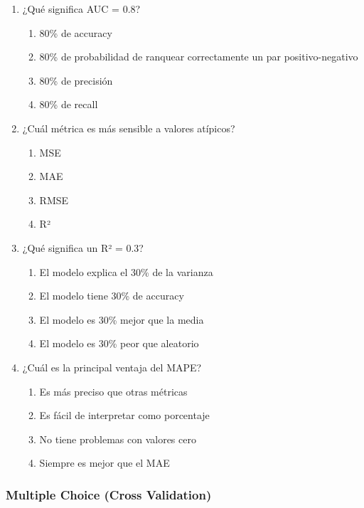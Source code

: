 \documentclass[12pt]{article}
\begin{document}
\begin{enumerate}
    \item ¿Qué significa AUC = 0.8?
    \begin{enumerate}
        \item 80\% de accuracy
        \item 80\% de probabilidad de ranquear correctamente un par positivo-negativo
        \item 80\% de precisión
        \item 80\% de recall
    \end{enumerate}
    
    \item ¿Cuál métrica es más sensible a valores atípicos?
    \begin{enumerate}
        \item MSE
        \item MAE
        \item RMSE
        \item R²
    \end{enumerate}
    
    \item ¿Qué significa un R² = 0.3?
    \begin{enumerate}
        \item El modelo explica el 30\% de la varianza
        \item El modelo tiene 30\% de accuracy
        \item El modelo es 30\% mejor que la media
        \item El modelo es 30\% peor que aleatorio
    \end{enumerate}
    
    \item ¿Cuál es la principal ventaja del MAPE?
    \begin{enumerate}
        \item Es más preciso que otras métricas
        \item Es fácil de interpretar como porcentaje
        \item No tiene problemas con valores cero
        \item Siempre es mejor que el MAE
    \end{enumerate}
\end{enumerate}

\subsubsection{Multiple Choice (Cross Validation)}
\end{document}
